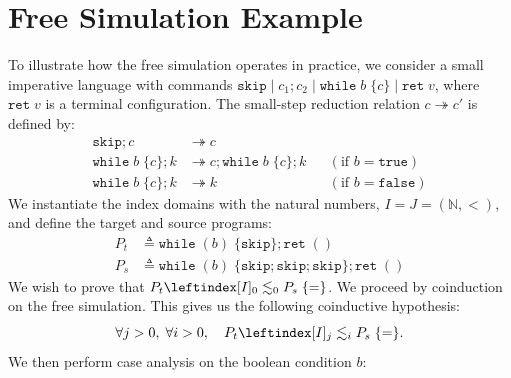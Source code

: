 \documentclass[report.tex]{subfiles}
\begin{document}
\section{Free Simulation Example}
\label{app:free-sim-example}

To illustrate how the free simulation operates in practice,
we consider a small imperative language with commands
$\mathtt{skip} \mid c_1 ; c_2 \mid \mathtt{while}\; b\; \{ c \} \mid \mathtt{ret}\; v$,
where $\mathtt{ret}\; v$ is a terminal configuration.
The small-step reduction relation $c \twoheadrightarrow c'$ is defined by:
\begin{align*}
  \mathtt{skip} ; c
  & \twoheadrightarrow c
  \\
  \mathtt{while}\; b\; \{ c \} ; k
  & \twoheadrightarrow c ; \mathtt{while}\; b\; \{ c \} ; k
  && (\text{if } b = \mathtt{true})
  \\
  \mathtt{while}\; b\; \{ c \} ; k
  & \twoheadrightarrow k
  && (\text{if } b = \mathtt{false})
\end{align*}
We instantiate the index domains with the natural numbers,
$I = J = (\mathbb{N}, <)$,
and define the target and source programs:
\begin{align*}
  P_t
  & \triangleq
    \mathtt{while}\; (b)\; \{\mathtt{skip}\} ; \mathtt{ret}\; () \\
  P_s
  & \triangleq
    \mathtt{while}\; (b)\; \{\mathtt{skip} ; \mathtt{skip} ; \mathtt{skip}\} ;
    \mathtt{ret}\; ()
\end{align*}
We wish to prove that $\fsim{P_t}{0}{0}{P_s}{=}$.
We proceed by coinduction on the free simulation.
This gives us the following coinductive hypothesis:
\begin{equation*}
  \forall j > 0,\; \forall i > 0,\quad \fsim{P_t}{j}{i}{P_s}{=}.
\end{equation*}
We then perform case analysis on the boolean condition $b$:
\end{document}
